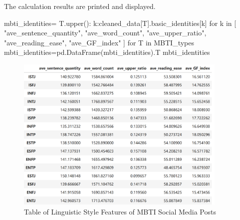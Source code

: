 \documentclass[12pt]{article}
\numberwithin{figure}{section}  %
\begin{document}
	The calculation results are printed and displayed.
	\begin{python}
mbti_identities={
    T.upper():{
        k:cleaned_data[T].basic_identities[k]
        for k in [
        "ave_sentence_quantity",
        "ave_word_count",
        "ave_upper_ratio",
        "ave_reading_ease",
        "ave_GF_index"
        ]
    }
    for T in MBTI_types
}
mbti_identities=pd.DataFrame(mbti_identities).T
mbti_identities
	\end{python}
	\begin{figure}[H]
		\centering
		\includegraphics[width=0.9\textwidth]{Q2wordchart} 
		\caption{Table of Linguistic Style Features of MBTI Social Media Posts}		
	\end{figure}
	
\end{document}
